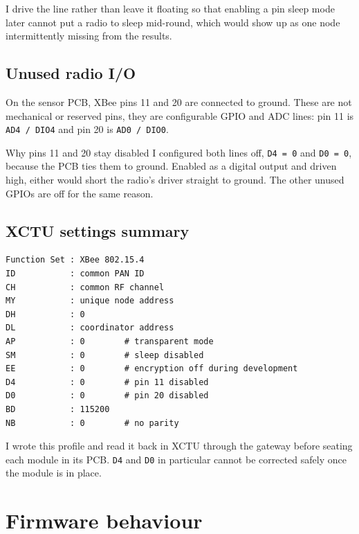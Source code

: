 \documentclass[11pt,a4paper]{article}
\newcommand{\code}[1]{\texttt{#1}}
\begin{document}
I drive the line rather than leave it floating so that enabling a pin sleep mode
later cannot put a radio to sleep mid-round, which would show up as one node
intermittently missing from the results.

\subsection{Unused radio I/O}

On the sensor PCB, XBee pins 11 and 20 are connected to ground. These are not
mechanical or reserved pins, they are configurable GPIO and ADC lines: pin 11 is
\code{AD4 / DIO4} and pin 20 is \code{AD0 / DIO0}.

\begin{warnbox}{Why pins 11 and 20 stay disabled}
I configured both lines off, \code{D4 = 0} and \code{D0 = 0}, because the PCB ties
them to ground. Enabled as a digital output and driven high, either would short
the radio's driver straight to ground. The other unused GPIOs are off for the
same reason.
\end{warnbox}

\subsection{XCTU settings summary}

\begin{lstlisting}[caption={Typical sensor-node profile.}]
Function Set : XBee 802.15.4
ID           : common PAN ID
CH           : common RF channel
MY           : unique node address
DH           : 0
DL           : coordinator address
AP           : 0        # transparent mode
SM           : 0        # sleep disabled
EE           : 0        # encryption off during development
D4           : 0        # pin 11 disabled
D0           : 0        # pin 20 disabled
BD           : 115200
NB           : 0        # no parity
\end{lstlisting}

I wrote this profile and read it back in XCTU through the gateway before seating
each module in its PCB. \code{D4} and \code{D0} in particular cannot be corrected
safely once the module is in place.

\section{Firmware behaviour}
\end{document}
